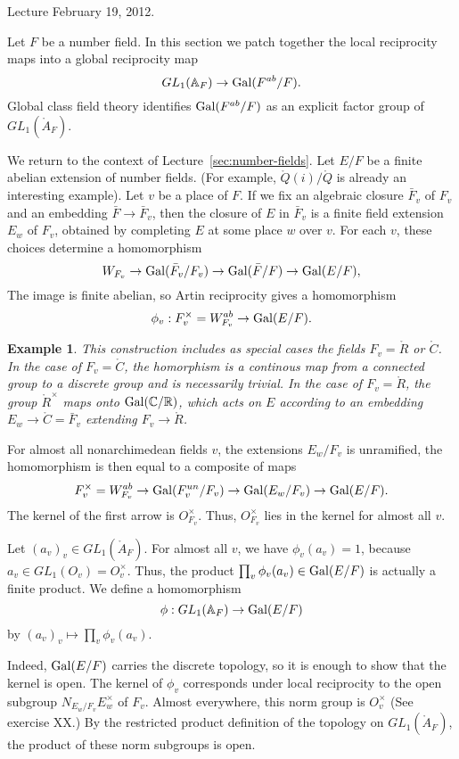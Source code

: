 \documentclass{amsart}
\newtheorem{example}[exercise]{Example}
\def\CC{\ring{C}}
\def\RR{\ring{R}}
\def\QQ{\ring{Q}}
\def\AA{\ring{A}}
\def\oG{\op{Gal}}
\def\bF{{\bar F}}
\begin{document}
Lecture February 19, 2012.


Let $F$ be a number field.
In this section we patch together the local reciprocity maps into 
a global reciprocity map
\[
GL_1(\AA_F) \to \oG(F^{ab}/F).
\]
Global class field theory identifies $\oG(F^{ab}/F)$ as
an explicit factor group of $GL_1(\AA_F)$.

We return to the context of Lecture~\ref{sec:number-fields}.
Let $E/F$ be a finite abelian extension of number fields.  (For example, $\QQ(i)/\QQ$
is already an interesting example).  Let $v$ be a place of $F$.  If we fix an algebraic
closure $\bF_v$ of $F_v$ and an embedding $\bF\to \bF_v$, then the closure of
$E$ in $\bF_v$ is a finite field extension $E_w$ of $F_v$, obtained by completing
$E$ at some place $w$ over $v$.
For each $v$, these choices determine a homomorphism
\[
W_{F_v} \to \oG(\bF_v/F_v) \to \oG(\bF/F)\to \oG(E/F),
\]
The image is finite abelian, so Artin reciprocity gives a homomorphism
\[
\phi_v:F_v^\times = W^{ab}_{F_v} \to \oG(E/F).
\]

\begin{example}
This construction includes as special cases the fields $F_v = \RR$ or $\CC$.
In the case of $F_v=\CC$, the homorphism is a continous map from a connected
group to a discrete group and is necessarily trivial.  In the case of $F_v = \RR$, the
group $\RR^\times$ maps onto $\oG(\CC/\RR)$, which acts on $E$ according to an
embedding $E_w\to \CC=\bF_v$ extending $F_v\to\RR$.
\end{example}

For almost all nonarchimedean fields $v$, 
the extensions $E_w/F_v$ is unramified,  the homomorphism is
then equal to a composite of maps
\[
F_v^\times = W_{F_v}^{ab} \to \oG(F^{un}_v/F_v) \to \oG(E_w/F_v) \to \oG(E/F).
\]
The kernel of the first arrow is $O_{F_v}^\times$.  Thus, $O_{F_v}^\times$ lies in
the kernel for almost all $v$.

Let $(a_v)_v\in GL_1(\AA_F)$.  For almost all $v$, we have
$\phi_v(a_v) = 1$, because $a_v\in GL_1(O_v) = O_v^\times$.  Thus, the product
$\prod_v \phi_v(a_v) \in \oG(E/F)$ is actually a finite product.  We define a homomorphism
\[
\phi: GL_1(\AA_F)\to \oG(E/F)
\]
by $(a_v)_v\mapsto \prod_v\phi_v(a_v)$.

 Indeed, $\oG(E/F)$
carries the discrete topology, so it is enough to show that the kernel is open.  The
kernel of $\phi_v$ corresponds under local reciprocity to the open subgroup
$N_{E_w/F_v} E_w^\times$ of $F_v$.  Almost everywhere, this norm group is $O_v^\times$
(See exercise XX.)  By the restricted product 
definition of the topology on $GL_1(\AA_F)$, the product of these norm subgroups is open.
\end{document}
